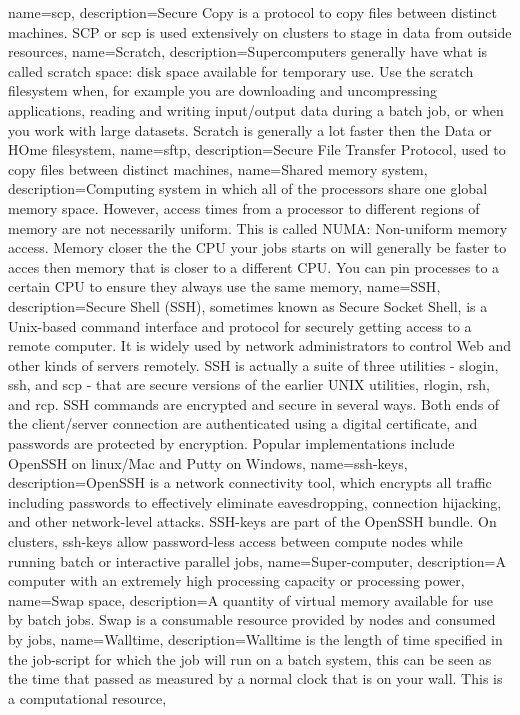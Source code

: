 {
  name={scp},
  description={Secure Copy is a protocol to copy files between distinct machines. SCP or scp is used extensively on \hpc clusters to stage in data from outside resources},
}
{
  name={Scratch},
  description={Supercomputers generally have what is called scratch space: disk space available for temporary use. Use the scratch filesystem when, for example you are downloading and uncompressing applications, reading and writing input/output data during a batch job, or when you work with large datasets. Scratch is generally a lot faster then the Data or HOme filesystem},
}
{
  name={sftp},
  description={Secure File Transfer Protocol, used to copy files between distinct machines},
}
{
  name={Shared memory system},
  description={Computing system in which all of the processors share one global memory space. However, access times from a processor to different regions of memory are not necessarily uniform. This is called NUMA: Non-uniform memory access. Memory closer the the CPU your jobs starts on will generally be faster to acces then memory that is closer to a different CPU. You can pin processes to a certain CPU to ensure they always use the same memory},
}
{
  name={SSH},
  description={Secure Shell (SSH), sometimes known as Secure Socket Shell, is a Unix-based command interface and protocol for securely getting access to a remote computer. It is widely used by network administrators to control Web and other kinds of servers remotely. SSH is actually a suite of three utilities - slogin, ssh, and scp - that are secure versions of the earlier UNIX utilities, rlogin, rsh, and rcp. SSH commands are encrypted and secure in several ways. Both ends of the client/server connection are authenticated using a digital certificate, and passwords are protected by encryption. Popular implementations include OpenSSH on linux/Mac and Putty on Windows},
}
{
  name={ssh-keys},
  description={OpenSSH is a network connectivity tool, which encrypts all traffic including passwords to effectively eliminate eavesdropping, connection hijacking, and other network-level attacks. SSH-keys are part of the OpenSSH bundle. On \hpc clusters, ssh-keys allow password-less access between compute nodes while running batch or interactive parallel jobs},
}
{
  name={Super-computer},
  description={A computer with an extremely high processing capacity or processing power},
}
{
  name={Swap space},
  description={A quantity of virtual memory available for use by batch jobs. Swap is a consumable resource provided by nodes and consumed by jobs},
}
{
  name={Walltime},
  description={Walltime is the length of time specified in the job-script for which the job will run on a batch system, this can be seen as the time that passed as measured by a normal clock that is on your wall. This is a computational resource},
}
